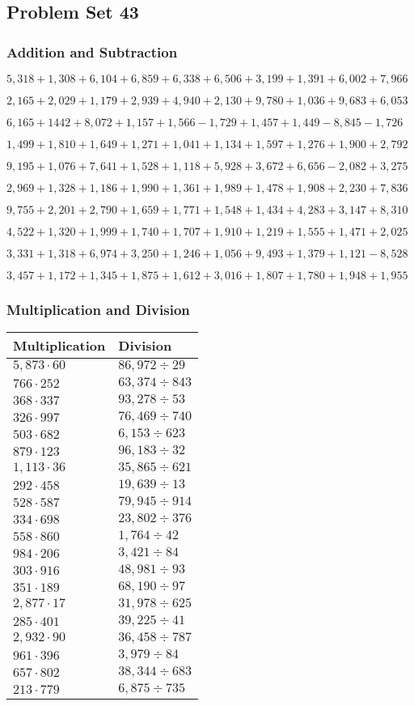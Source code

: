 \hypertarget{problem-set-43-2}{%
\subsection{Problem Set 43}\label{problem-set-43-2}}

\hypertarget{addition-and-subtraction-205}{%
\subsubsection{Addition and
Subtraction}\label{addition-and-subtraction-205}}

\(5,318+1,308+6,104+6,859+6,338+6,506+3,199+1,391+6,002+ 7,966\)

\(2,165+2,029+1,179+2,939+4,940+2,130+9,780+1,036+9,683+6,053\)

\(6,165+1442+8,072+1,157+1,566-1,729+1,457+1,449-8,845-1,726\)

\(1,499+1,810+1,649+1,271+1,041+1,134+1,597+1,276+1,900+2,792\)

\(9,195+1,076+7,641+1,528+1,118+5,928+3,672+6,656-2,082+3,275\)

\(2,969+1,328+1,186+1,990+1,361+1,989+1,478+1,908+2,230+7,836\)

\(9,755+2,201+2,790+1,659+1,771+1,548+1,434+4,283+3,147+8,310\)

\(4,522+1,320+1,999+1,740+1,707+1,910+1,219+1,555+1,471+2,025\)

\(3,331+1,318+6,974+3,250+1,246+1,056+9,493+1,379+1,121-8,528\)

\(3,457+1,172+1,345+1,875+1,612+3,016+1,807+1,780+1,948+1,955\)

\hypertarget{multiplication-and-division-204}{%
\subsubsection{Multiplication and
Division}\label{multiplication-and-division-204}}

\begin{longtable}[]{@{}ll@{}}
\toprule
Multiplication & Division\tabularnewline
\midrule
\endhead
\(5,873\cdot60\) & \(86,972÷29\)\tabularnewline
\(766\cdot252\) & \(63,374÷843\)\tabularnewline
\(368\cdot337\) & \(93,278÷53\)\tabularnewline
\(326\cdot997\) & \(76,469÷740\)\tabularnewline
\(503\cdot682\) & \(6,153÷623\)\tabularnewline
\(879\cdot123\) & \(96,183÷32\)\tabularnewline
\(1,113\cdot36\) & \(35,865÷621\)\tabularnewline
\(292\cdot458\) & \(19,639÷13\)\tabularnewline
\(528\cdot587\) & \(79,945÷914\)\tabularnewline
\(334\cdot698\) & \(23,802÷376\)\tabularnewline
\(558\cdot860\) & \(1,764÷42\)\tabularnewline
\(984\cdot206\) & \(3,421÷84\)\tabularnewline
\(303\cdot916\) & \(48,981÷93\)\tabularnewline
\(351\cdot189\) & \(68,190÷97\)\tabularnewline
\(2,877\cdot17\) & \(31,978÷625\)\tabularnewline
\(285\cdot401\) & \(39,225÷41\)\tabularnewline
\(2,932\cdot90\) & \(36,458÷787\)\tabularnewline
\(961\cdot396\) & \(3,979÷84\)\tabularnewline
\(657\cdot802\) & \(38,344÷683\)\tabularnewline
\(213\cdot779\) & \(6,875÷735\)\tabularnewline
\bottomrule
\end{longtable}

